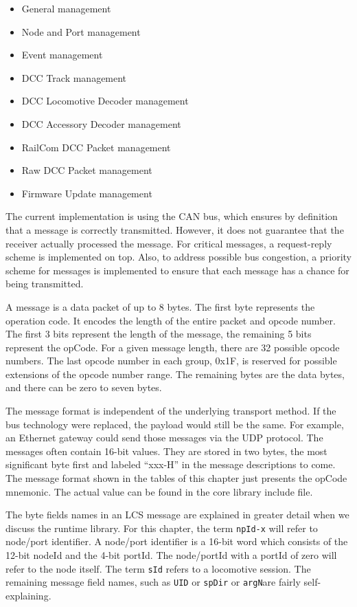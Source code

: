 \begin{itemize}
    \item General management
    \item Node and Port management
    \item Event management
    \item DCC Track management
    \item DCC Locomotive Decoder management
    \item DCC Accessory Decoder management
    \item RailCom DCC Packet management
    \item Raw DCC Packet management
    \item Firmware Update management
\end{itemize}

The current implementation is using the CAN bus, which ensures by definition that a message is correctly transmitted. However, it does not guarantee that the receiver actually processed the message. For critical messages, a request-reply scheme is implemented on top. Also, to address possible bus congestion, a priority scheme for messages is implemented to ensure that each message has a chance for being transmitted.

A message is a data packet of up to 8 bytes. The first byte represents the operation code. It encodes the length of the entire packet and opcode number. The first 3 bits represent the length of the message, the remaining 5 bits represent the opCode. For a given message length, there are 32 possible opcode numbers. The last opcode number in each group, 0x1F, is reserved for possible extensions of the opcode number range. The remaining bytes are the data bytes, and there can be zero to seven bytes. 

The message format is independent of the underlying transport method. If the bus technology were replaced, the payload would still be the same. For example, an Ethernet gateway could send those messages via the UDP protocol. The messages often contain 16-bit values. They are stored in two bytes, the most significant byte first and labeled ``xxx-H'' in the message descriptions to come. The message format shown in the tables of this chapter just presents the opCode mnemonic. The actual value can be found in the core library include file.

The byte fields names in an LCS message are explained in greater detail when we discuss the runtime library. For this chapter, the term \texttt{npId-x} will refer to node/port identifier. A node/port identifier is a 16-bit word which consists of the 12-bit nodeId and the 4-bit portId. The node/portId with a portId of zero will refer to the node itself. The term \texttt{sId} refers to a locomotive session. The remaining message field names, such as \texttt{UID} or \texttt{spDir} or \texttt{argN}are fairly self-explaining.

